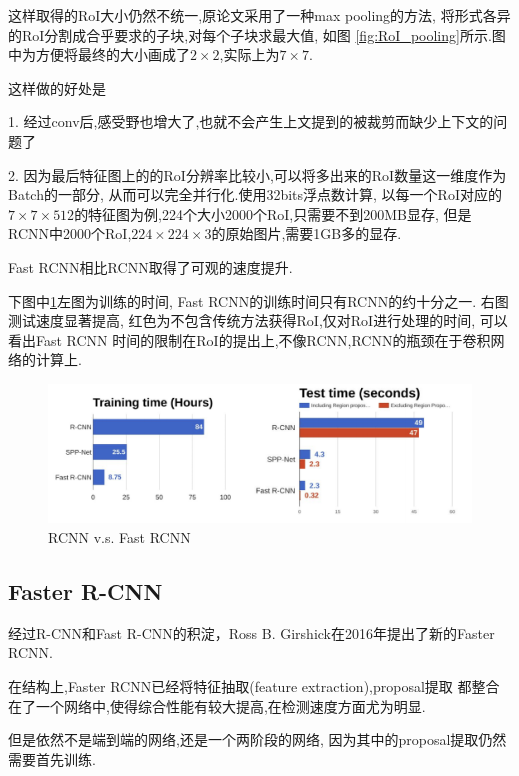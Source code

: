 这样取得的RoI大小仍然不统一,原论文采用了一种max pooling的方法,
将形式各异的RoI分割成合乎要求的子块,对每个子块求最大值,
如图 \ref{fig:RoI_pooling}所示.图中为方便将最终的大小画成了$2\times 2$,实际上为$7\times 7$.

这样做的好处是

1. 经过conv后,感受野也增大了,也就不会产生上文提到的被裁剪而缺少上下文的问题了

2. 因为最后特征图上的的RoI分辨率比较小,可以将多出来的RoI数量这一维度作为Batch的一部分,
从而可以完全并行化.使用32bits浮点数计算,
以每一个RoI对应的$7\times 7\times 512$的特征图为例,224个大小2000个RoI,只需要不到200MB显存,
但是RCNN中2000个RoI,$224\times 224\times 3$的原始图片,需要1GB多的显存.

Fast RCNN相比RCNN取得了可观的速度提升.

下图中\ref{fig:rcnn_vs_frcnn}左图为训练的时间,
Fast RCNN的训练时间只有RCNN的约十分之一.
右图测试速度显著提高, 红色为不包含传统方法获得RoI,仅对RoI进行处理的时间,
可以看出Fast RCNN
时间的限制在RoI的提出上,不像RCNN,RCNN的瓶颈在于卷积网络的计算上.

\begin{figure}[htbp]
    \centering
    \includegraphics[scale=0.65]{figures/rcnn_vs_frcnn.png}
    \caption{RCNN v.s. Fast RCNN}
    \label{fig:rcnn_vs_frcnn}
\end{figure}

\subsection{Faster R-CNN}

经过R-CNN和Fast R-CNN的积淀，Ross B. Girshick在2016年提出了新的Faster RCNN.

在结构上,Faster RCNN已经将特征抽取(feature extraction),proposal提取
都整合在了一个网络中,使得综合性能有较大提高,在检测速度方面尤为明显.

但是依然不是端到端的网络,还是一个两阶段的网络, 因为其中的proposal提取仍然需要首先训练.

